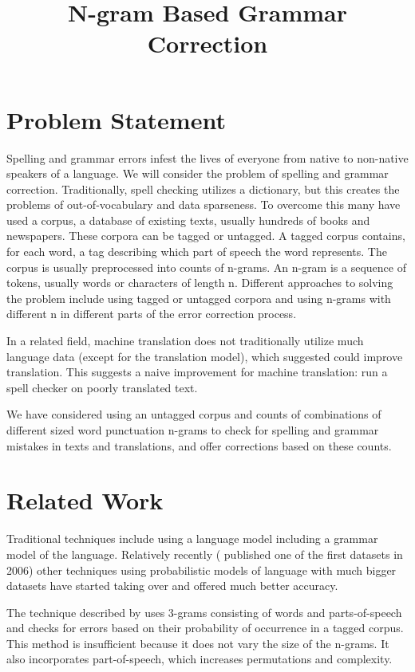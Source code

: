 \documentclass[twocolumn]{article}
\title{N-gram Based Grammar Correction}
\date{}
\begin{document}
%
%


\maketitle
\section{Problem Statement}
Spelling and grammar errors infest the lives of everyone from native to
non-native speakers of a language. We will consider the problem of spelling and
grammar correction. Traditionally, spell checking utilizes a dictionary, but
this creates the problems of out-of-vocabulary and data sparseness. To overcome
this many have used a corpus, a database of existing texts, usually hundreds of
books and newspapers. These corpora can be tagged or untagged. A tagged corpus
contains, for each word, a tag describing which part of speech the word
represents. The corpus is usually preprocessed into counts of n-grams. An n-gram
is a sequence of tokens, usually words or characters of length n. Different
approaches to solving the problem include using tagged or untagged corpora and
using n-grams with different n in different parts of the error correction
process.

In a related field, machine translation does not traditionally utilize much
language data (except for the translation model), which \cite{norvig09}
suggested could improve translation. This suggests a naive improvement for
machine translation: run a spell checker on poorly translated text.

We have considered using an untagged corpus and counts of combinations of
different sized word punctuation n-grams to check for spelling and grammar
mistakes in texts and translations, and offer corrections based on these counts.

\section{Related Work}
Traditional techniques include using a language model including a grammar model
of the language. Relatively recently (\cite{michel11} published one of the first
datasets in 2006) other techniques using probabilistic models of language with
much bigger datasets have started taking over and offered much better accuracy.

The technique described by \cite{Fossati07} uses 3-grams consisting of words and
parts-of-speech and checks for errors based on their probability of occurrence
in a tagged corpus. This method is insufficient because it does not vary the
size of the n-grams. It also incorporates part-of-speech, which increases
permutations and complexity.
\end{document}
